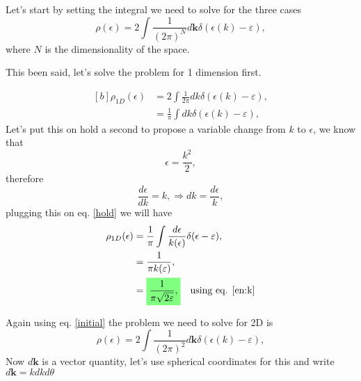 \begin{questions}
\begin{solution}
  Let's start by setting the integral we need to solve for the three cases
  \begin{equation}
    \rho(\epsilon) = 2\int \frac{1}{(2\pi)^N}d\bm{k} \delta(\epsilon(k) - \varepsilon),
    \label{initial}
  \end{equation}
  where $N$ is the dimensionality of the space.

  This been said, let's solve the problem for 1 dimension first.

  \begin{equation}
    \begin{aligned}[b]
      \rho_{1D}(\epsilon) &= 2\int \frac{1}{2\pi}dk \delta(\epsilon(k) - \varepsilon),\\
      &= \frac{1}{\pi} \int dk \delta(\epsilon(k) - \varepsilon),
    \end{aligned}
    \label{hold}
  \end{equation}
  Let's put this on hold a second to propose a variable change from $k$ to $\epsilon$, we know that
  \begin{equation}
    \epsilon = \frac{k^2}{2},
    \label{en:k}
  \end{equation}
   therefore
  \begin{equation}
    \frac{d\epsilon}{dk} = k,  \Rightarrow dk = \frac{d\epsilon}{k},
    \label{var:change}
  \end{equation}
plugging this on eq. \ref{hold} we will have
\begin{equation}
  \begin{aligned}[b]
    \rho_{1D}(\epsilon) &= \frac{1}{\pi} \int \frac{d\epsilon}{k(\epsilon)}\delta(\epsilon - \varepsilon),\\
    &= \frac{1}{\pi k(\varepsilon)},\\
    &= \hlgreen{\frac{1}{\pi \sqrt{2\varepsilon}},} \quad \text{using eq. \ref{en:k}}
  \end{aligned}
\end{equation}
\end{solution}
\begin{solution}
Again using eq. \ref{initial} the problem we need to solve for 2D is
\begin{equation}
  \rho(\epsilon) = 2\int \frac{1}{(2\pi)^2}d\bm{k} \delta(\epsilon(k) - \varepsilon),
\end{equation}
Now $d\bm{k}$ is a vector quantity, let's use spherical coordinates for this and write $d\bm{k} = kdkd\theta$

\end{solution}
\end{questions}
